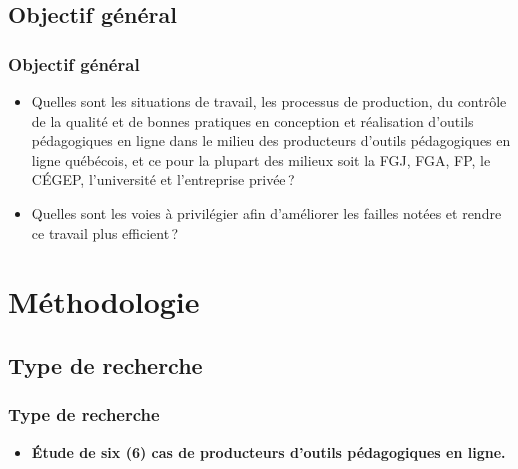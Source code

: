                 \subsection{Objectif général} 
		\begin{frame}
			\frametitle{Objectif général}
                        
                        \begin{itemize} 
                        \item  Quelles sont les situations de travail, les processus de production, du contrôle de la qualité et de bonnes pratiques en conception et réalisation d’outils pédagogiques en ligne dans le milieu des producteurs d’outils pédagogiques en ligne québécois, et ce pour la plupart des milieux soit la FGJ, FGA, FP, le CÉGEP, l’université et l’entreprise privée\,? 
                         \item Quelles sont les voies à privilégier afin d’améliorer les failles notées et rendre ce travail plus efficient\,?

                        \end{itemize}

             
                \end{frame}
                
	\section{Méthodologie} 
		
                        
				\subsection{Type de recherche} 
					\begin{frame}
						\frametitle{Type de recherche}
                        
                        			\begin{itemize} 
                       				 \item \textbf{Étude de six (6) cas de producteurs d’outils pédagogiques en ligne.} 

                       		 \end{itemize}
				\end{frame}
